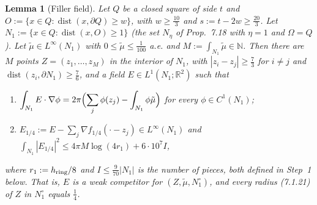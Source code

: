 \documentclass[11pt]{article}
\newtheorem{sublemma}{Lemma}[theorem]
\theoremstyle{definition}
\theoremstyle{remark}
\newcommand{\R}{\mathbb R}
\newcommand{\N}{\mathbb N}
\begin{document}
\begin{sublemma}[Filler field]\label{lem:filler}
Let $Q$ be a closed square of side $t$ and $O:=\{x\in Q:\operatorname{dist}(x,\partial Q)\ge w\}$, with
$w\ge\tfrac{10}3$ and $s:=t-2w\ge\tfrac{20}3$. Let $N_1:=\{x\in Q:\operatorname{dist}(x,O)\ge1\}$ (the
set $N_\eta$ of Prop.~7.18 with $\eta=1$ and $\Omega=Q$). Let $\tilde\mu\in L^\infty(N_1)$ with
$0\le\tilde\mu\le\tfrac1{100}$ a.e. and $M:=\int_{N_1}\tilde\mu\in\N$. Then there are $M$ points
$Z=(z_1,\dots,z_M)$ in the interior of $N_1$, with $|z_i-z_j|\ge\tfrac73$ for $i\ne j$ and
$\operatorname{dist}(z_i,\partial N_1)\ge\tfrac76$, and a field $E\in L^1(N_1;\R^2)$ such that
\begin{enumerate}[label=(\roman*)]
\item $\displaystyle\int_{N_1}E\cdot\nabla\phi=2\pi\Bigl(\sum_j\phi(z_j)-\int_{N_1}\phi\tilde\mu\Bigr)$ for every
  $\phi\in C^1(N_1)$;
\item $E_{1/4}:=E-\sum_j\nabla f_{1/4}(\cdot-z_j)\in L^\infty(N_1)$ and
  $\displaystyle\int_{N_1}|E_{1/4}|^2\le4\pi M\log(4r_1)+6\cdot10^7I$,
\end{enumerate}
where $r_1:=h_{\rm ring}/8$ and $I\le\tfrac9{70}|N_1|$ is the number of pieces, both defined in Step~1 below.
That is, $E$ is a weak competitor for $(Z,\tilde\mu,N_1^\circ)$, and every radius (7.1.21) of $Z$ in
$N_1^\circ$ equals $\tfrac14$.
\end{sublemma}
\end{document}
